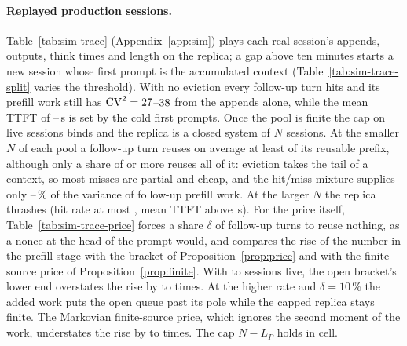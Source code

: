 \paragraph{Replayed production sessions.} Table~\ref{tab:sim-trace}
(Appendix~\ref{app:sim}) plays each real session's appends, outputs, think times and length on
the replica; a gap above ten minutes starts a new session whose first
prompt is the accumulated context (Table~\ref{tab:sim-trace-split}
varies the threshold). With no eviction every follow-up turn
hits and its prefill work still has
$\mathrm{CV}^2=27$--$38$ from the
appends alone, while the mean TTFT of
\simTraceOpenTtftMin--\simTraceOpenTtftMax\,s is set by the cold first
prompts. Once the pool is finite the cap on live sessions binds and
the replica is a closed system of $N$ sessions. At the smaller $N$ of
each pool a follow-up turn reuses on average at least
\simTraceTightReusedMin{} of its reusable prefix, although only a share
of \simTraceTightHitMin{} or more reuses all of it: eviction takes the
tail of a context, so most misses are partial and cheap, and the
hit/miss mixture supplies only
\simTraceTightMixMin--\simTraceTightMixMax\,\% of the variance of
follow-up prefill work. At the larger $N$ the replica thrashes (hit
rate at most \simTraceLooseHitMax, mean TTFT above
\simTraceLooseTtftMin\,s). \simTracePkClaim{} For
the price itself, Table~\ref{tab:sim-trace-price} forces a share
$\delta$ of follow-up turns to reuse nothing, as a nonce at the head of
the prompt would, and compares the rise of
the number in the prefill stage with the bracket of
Proposition~\ref{prop:price} and with the finite-source price of
Proposition~\ref{prop:finite}. With \simPriceLiveMin{} to
\simPriceLiveMax{} sessions live, the open bracket's lower end
overstates the rise by \simPriceOverMin{} to \simPriceOverMax{} times.
At the higher rate and $\delta=10\,\%$ the added work puts the open
queue past its pole while the capped replica stays finite. The
Markovian finite-source price, which ignores the second moment of the
work, understates the rise by \simPriceFiniteRatioMin{} to
\simPriceFiniteRatioMax{} times. The cap $N-L_P$ holds in
\simPriceCapHolds{} cell.
